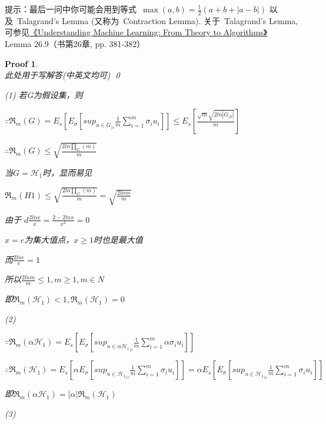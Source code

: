 \documentclass[a4paper,UTF8]{article}
\numberwithin{equation}{section}
\newtheorem*{myProof}{Proof}
\begin{document}
\noindent 提示：最后一问中你可能会用到等式~$\max(a, b) =\frac{1}{2}(a+b+|a-b|)$ 以及~Talagrand's Lemma (又称为~Contraction Lemma). 关于~Talagrand's Lemma, 可参见\href{http://www.cs.huji.ac.il/~shais/UnderstandingMachineLearning/copy.html}{《Understanding Machine Learning: From Theory to Algorithms》} ~ Lemma 26.9（书第26章, pp. 381-382）

\begin{myProof}~\\
    此处用于写解答(中英文均可)
    \qed
    
    
    (1)
    若G为假设集，则
    
    $\because \mathfrak{R}_m\left ( G \right ) = E_s\left [ E_\sigma \left [ sup_{u\in G_{|s}}\frac{1}{m}\sum_{i=1}^{m}\sigma _iu_i\right ] \right ]\leq E_s\left [ \frac{\sqrt{m}\sqrt{2ln|G_{|S}|}}{m} \right ]$
    
    $\therefore \mathfrak{R}_m\left ( G \right )\leq \sqrt{\frac{2ln\prod_{G}^{}\left ( m \right )}{m}}$
    
    当$G=\mathcal{H}_1$时，显而易见
    
    $\mathfrak{R}_m\left ( H1 \right )\leq\sqrt{\frac{2ln\prod_{G}^{}\left ( m \right )}{m}} = \sqrt{\frac{2ln m}{m}} $
    	
    由于
    $d\frac{2ln x}{x} = \frac{2-2lnx}{x^{2}} = 0$
    
    $x=e$为集大值点，$x \geq 1$时也是最大值
    
    而$\frac{2lne}{e} = 1$
    
    所以$\frac{2lnm}{m} \leq 1 , m\geq1, m \in N$
    
    即$\mathfrak{R}_m\left ( \mathcal{H}_1 \right ) < 1, \mathfrak{R}_m\left (\mathcal{H}_1  \right )=0$
    
    
    (2)
    
    $\because \mathfrak{R}_m\left ( \mathcal{\alpha H}_1 \right ) = E_s\left [ E_\sigma \left [ sup_{u\in {\mathcal{\alpha H}_1}_{|s}}\frac{1}{m}\sum_{i=1}^{m}\alpha \sigma _iu_i\right ] \right ]$
    
    $\therefore  \mathfrak{R}_m\left ( \mathcal{ H}_1 \right )=E_s\left [\alpha  E_\sigma \left [ sup_{u\in {\mathcal{ H}_1}_{|s}}\frac{1}{m}\sum_{i=1}^{m} \sigma _iu_i\right ] \right ]=\alpha E_s\left [  E_\sigma \left [ sup_{u\in {\mathcal{ H}_1}_{|s}}\frac{1}{m}\sum_{i=1}^{m} \sigma _iu_i\right ] \right ]$
    
    即$\mathfrak{R}_m(\alpha \mathcal{H}_1) = |\alpha|\mathfrak{R}_m(\mathcal{H}_1)$
    
    (3)
    

\end{myProof}
\end{document}
